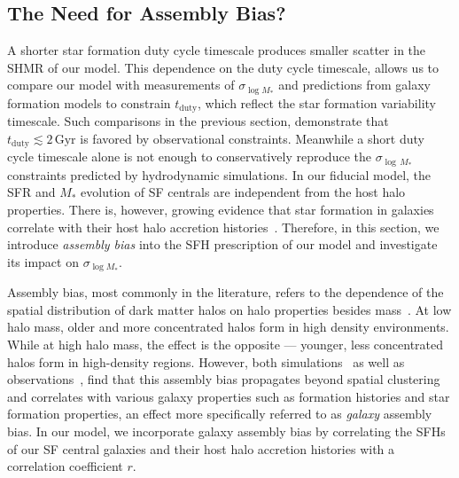 \documentclass[12pt, letterpaper, preprint, tighten]{aastex62}
\newcommand{\ch}[1]{\color{orange}{\bf CH:} #1}
\begin{document}
\subsection{The Need for Assembly Bias?}
A shorter star formation duty cycle timescale produces smaller scatter in the 
SHMR of our model. This dependence on the duty cycle timescale, allows us to 
compare our model with measurements of $\sigma_{\log M_*}$ and predictions 
from galaxy formation models to constrain $t_\mathrm{duty}$, which reflect 
the star formation variability timescale. Such comparisons in the previous 
section, demonstrate that $t_\mathrm{duty} \lesssim 2\,\mathrm{Gyr}$ is 
favored by observational constraints. Meanwhile a short duty cycle 
timescale alone is not enough to conservatively reproduce the $\sigma_{\log\,M_*}$ 
constraints predicted by hydrodynamic simulations. In our fiducial model, 
the SFR and $M_*$ evolution of SF centrals are independent from the
host halo properties. There is, however, growing evidence that star formation in  
galaxies correlate with their host halo accretion histories~\citep[\emph{e.g.}][]{lim2016, tojeiro2017, tinker2018b}. 
Therefore, in this section, we introduce \emph{assembly bias} into the SFH 
prescription of our model and investigate its impact on $\sigma_{\log M_*}$.

Assembly bias, most commonly in the literature, refers to the dependence of the 
spatial distribution of dark matter halos on halo properties besides 
mass~\citep{gao2005,wechsler2006,gao2007,wetzel2007,li2008,sunayama2016}.
At low halo mass, older and more concentrated halos form in high density environments. 
While at high halo mass, the effect is the opposite --- younger, less concentrated 
halos form in high-density regions. However, both 
simulations~\citep{croton2007, artale2018, zehavi2018} as well as  
observations~\citep{yang2006,wang2008,tinker2011,wang2013,lacerna2014,tinker2018},
find that this assembly bias propagates beyond spatial clustering and correlates
with various galaxy properties such as formation histories and star formation 
properties, an effect more specifically referred to as {\em galaxy} assembly bias. 
In our model, we incorporate galaxy assembly bias by correlating the SFHs 
of our SF central galaxies and their host halo accretion histories 
with a correlation coefficient $r$. 
\end{document}
